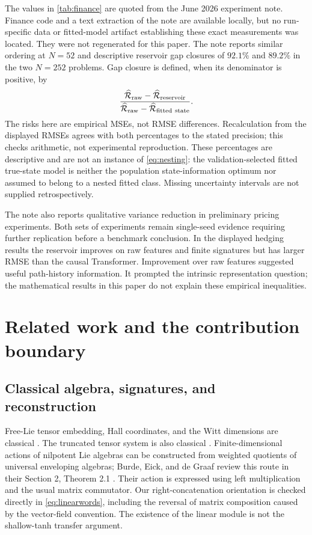 \documentclass[11pt,a4paper]{article}
\numberwithin{equation}{section}
\theoremstyle{definition}
\theoremstyle{remark}
\begin{document}
The values in \cref{tab:finance} are quoted from the June 2026 experiment
note. Finance code and a text extraction of the note are available locally,
but no run-specific data or fitted-model artifact establishing these exact
measurements was located. They were not regenerated for this paper.
The note reports
similar ordering at $N=52$ and descriptive reservoir gap closures of
$92.1\%$ and $89.2\%$ in the two $N=252$ problems. Gap closure is defined,
when its denominator is positive, by
\[
 \frac{\widehat{\mathcal R}_{\rm raw}-\widehat{\mathcal R}_{\rm reservoir}}
 {\widehat{\mathcal R}_{\rm raw}-\widehat{\mathcal R}_{\rm fitted\ state}}.
\]
The risks here are empirical MSEs, not RMSE differences. Recalculation from
the displayed RMSEs agrees with both percentages to the stated precision;
this checks arithmetic, not experimental reproduction. These percentages
are descriptive and are not an instance of \eqref{eq:nesting}: the
validation-selected fitted true-state model is neither the population
state-information optimum nor assumed to belong to a nested fitted class.
Missing uncertainty intervals are not supplied retrospectively.

The note also reports qualitative variance reduction in preliminary pricing
experiments. Both sets of experiments remain single-seed evidence requiring
further replication before a benchmark conclusion. In the displayed hedging
results the reservoir improves on raw features and finite signatures but has
larger RMSE than the causal Transformer. Improvement over raw features
suggested useful path-history information. It prompted the intrinsic
representation question; the mathematical results in this paper do not explain
these empirical inequalities.

\section{Related work and the contribution boundary}
\label{sec:related}
\subsection{Classical algebra, signatures, and reconstruction}
Free-Lie tensor embedding, Hall coordinates, and the Witt dimensions are
classical \cite{Reutenauer}. The truncated tensor system is also classical
\cite{FrizVictoir,AkyildirimAnomaly}. Finite-dimensional actions of
nilpotent Lie algebras can be constructed from weighted quotients of
universal enveloping algebras; Burde, Eick, and de Graaf review this route
in their Section 2, Theorem 2.1 \cite{Burde}. Their action is expressed
using left multiplication and the usual matrix commutator. Our
right-concatenation orientation is checked directly in
\eqref{eq:linearwords}, including the reversal of matrix composition
caused by the vector-field convention. The existence of the linear
module is not the shallow-tanh transfer argument.
\end{document}
